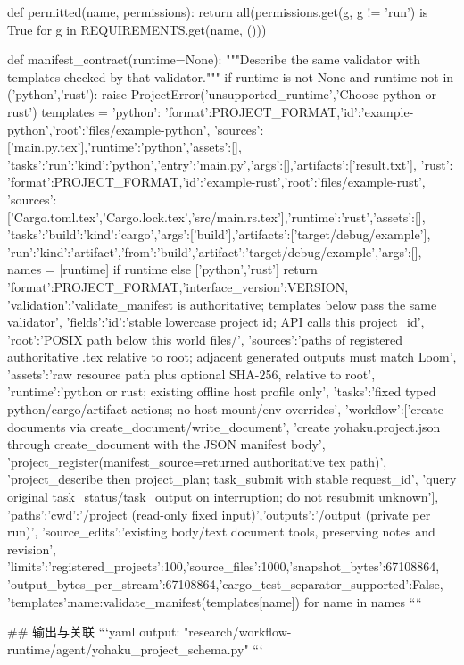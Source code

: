 def permitted(name, permissions):
    return all(permissions.get(g, g != 'run') is True for g in REQUIREMENTS.get(name, ()))


def manifest_contract(runtime=None):
    """Describe the same validator with templates checked by that validator."""
    if runtime is not None and runtime not in ('python','rust'):
        raise ProjectError('unsupported_runtime','Choose python or rust')
    templates = {
        'python': {'format':PROJECT_FORMAT,'id':'example-python','root':'files/example-python',
            'sources':['main.py.tex'],'runtime':'python','assets':[],
            'tasks':{'run':{'kind':'python','entry':'main.py','args':[],'artifacts':['result.txt']}}},
        'rust': {'format':PROJECT_FORMAT,'id':'example-rust','root':'files/example-rust',
            'sources':['Cargo.toml.tex','Cargo.lock.tex','src/main.rs.tex'],'runtime':'rust','assets':[],
            'tasks':{'build':{'kind':'cargo','args':['build'],'artifacts':['target/debug/example']},
                     'run':{'kind':'artifact','from':'build','artifact':'target/debug/example','args':[]}}},
    }
    names = [runtime] if runtime else ['python','rust']
    return {'format':PROJECT_FORMAT,'interface_version':VERSION,
        'validation':'validate_manifest is authoritative; templates below pass the same validator',
        'fields':{'id':'stable lowercase project id; API calls this project_id',
                  'root':'POSIX path below this world files/',
                  'sources':'paths of registered authoritative .tex relative to root; adjacent generated outputs must match Loom',
                  'assets':'raw resource path plus optional SHA-256, relative to root',
                  'runtime':'python or rust; existing offline host profile only',
                  'tasks':'fixed typed python/cargo/artifact actions; no host mount/env overrides'},
        'workflow':['create documents via create_document/write_document',
                    'create yohaku.project.json through create_document with the JSON manifest body',
                    'project_register(manifest_source=returned authoritative tex path)',
                    'project_describe then project_plan; task_submit with stable request_id',
                    'query original task_status/task_output on interruption; do not resubmit unknown'],
        'paths':{'cwd':'/project (read-only fixed input)','outputs':'/output (private per run)',
                 'source_edits':'existing body/text document tools, preserving notes and revision'},
        'limits':{'registered_projects':100,'source_files':1000,'snapshot_bytes':67108864,
                  'output_bytes_per_stream':67108864,'cargo_test_separator_supported':False},
        'templates':{name:validate_manifest(templates[name]) for name in names}}
````

## 输出与关联
```yaml
output: "research/workflow-runtime/agent/yohaku_project_schema.py"
```

